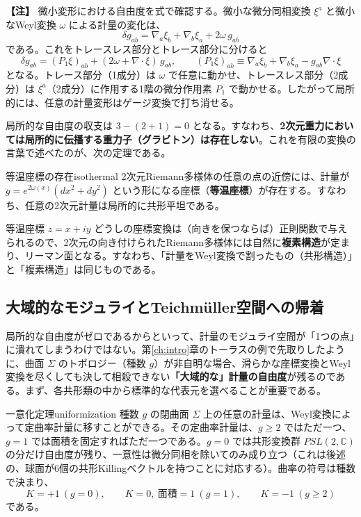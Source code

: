 \documentclass[uplatex, dvipdfmx, book]{jsbook}
\let\origsubsection\subsection
\let\origsubsubsection\subsubsection
\renewcommand{\section}{\origsubsection}
\renewcommand{\subsection}{\origsubsubsection}
\renewcommand{\subsubsection}{\paragraph}
\newenvironment{note}{\vspace{1ex}\par\footnotesize\noindent\textbf{【注】}}{\par\vspace{1ex}}
\begin{document}
\begin{note}
微小変形における自由度を式で確認する。微小な微分同相変換 $\xi^a$ と微小なWeyl変換 $\omega$ による計量の変化は、
\begin{equation*}
    \delta g_{ab} = \nabla_a \xi_b + \nabla_b \xi_a + 2\omega\, g_{ab}
\end{equation*}
である。これをトレースレス部分とトレース部分に分けると
\begin{equation*}
    \delta g_{ab} = (P_1\xi)_{ab} + (2\omega + \nabla\cdot\xi)\, g_{ab}, \qquad (P_1\xi)_{ab} \equiv \nabla_a\xi_b + \nabla_b\xi_a - g_{ab}\nabla\cdot\xi
\end{equation*}
となる。トレース部分（1成分）は $\omega$ で任意に動かせ、トレースレス部分（2成分）は $\xi^a$（2成分）に作用する1階の微分作用素 $P_1$ で動かせる。したがって局所的には、任意の計量変形はゲージ変換で打ち消せる。
\end{note}

局所的な自由度の収支は $3 - (2 + 1) = 0$ となる。すなわち、\textbf{2次元重力においては局所的に伝播する重力子（グラビトン）は存在しない}。これを有限の変換の言葉で述べたのが、次の定理である。

\begin{mythm}{等温座標の存在}{isothermal}
2次元Riemann多様体の任意の点の近傍には、計量が $g = e^{2\omega(x)}(dx^2 + dy^2)$ という形になる座標（\textbf{等温座標}）が存在する。すなわち、任意の2次元計量は局所的に共形平坦である。
\end{mythm}

等温座標 $z = x + iy$ どうしの座標変換は（向きを保つならば）正則関数で与えられるので、2次元の向き付けられたRiemann多様体には自然に\textbf{複素構造}が定まり、リーマン面となる。すなわち、「計量をWeyl変換で割ったもの（共形構造）」と「複素構造」は同じものである。

\section{大域的なモジュライとTeichm\"uller空間への帰着}

局所的な自由度がゼロであるからといって、計量のモジュライ空間が「1つの点」に潰れてしまうわけではない。第\ref{ch:intro}章のトーラスの例で先取りしたように、曲面 $\Sigma$ のトポロジー（種数 $g$）が非自明な場合、滑らかな座標変換とWeyl変換を尽くしても決して相殺できない\textbf{「大域的な」計量の自由度}が残るのである。まず、各共形類の中から標準的な代表元を選べることが重要である。

\begin{mythm}{一意化定理}{uniformization}
種数 $g$ の閉曲面 $\Sigma$ 上の任意の計量は、Weyl変換によって定曲率計量に移すことができる。その定曲率計量は、$g \ge 2$ ではただ一つ、$g = 1$ では面積を固定すればただ一つである。$g = 0$ では共形変換群 $PSL(2, \mathbb{C})$ の分だけ自由度が残り、一意性は微分同相を除いてのみ成り立つ（これは後述の、球面が6個の共形Killingベクトルを持つことに対応する）。曲率の符号は種数で決まり、
\begin{equation*}
    K = +1\ (g = 0), \qquad K = 0,\ \text{面積} = 1\ (g = 1), \qquad K = -1\ (g \ge 2)
\end{equation*}
である。
\end{mythm}
\end{document}
